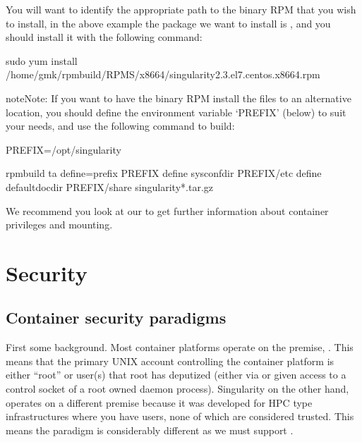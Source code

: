\documentclass[letterpaper,10pt,english]{sphinxmanual}
\begin{document}
You will want to identify the appropriate path to the binary RPM that
you wish to install, in the above example the package we want to install
is  , and you should install it with the following command:

%
\begin{sphinxVerbatim}[commandchars=\\\{\}]
\PYGZdl{} sudo yum install /home/gmk/rpmbuild/RPMS/x86\PYGZus{}64/singularity\PYGZhy{}2.3.el7.centos.x86\PYGZus{}64.rpm
\end{sphinxVerbatim}

\begin{sphinxadmonition}{note}{Note:}
If you want to have the binary RPM install the files to an
alternative location, you should define the environment variable
‘PREFIX’ (below) to suit your needs, and use the following command to
build:
\end{sphinxadmonition}

%
\begin{sphinxVerbatim}[commandchars=\\\{\}]
\PYGZdl{} PREFIX=/opt/singularity

\PYGZdl{} rpmbuild \PYGZhy{}ta \PYGZhy{}\PYGZhy{}define=\PYGZdq{}\PYGZus{}prefix \PYGZdl{}PREFIX\PYGZdq{} \PYGZhy{}\PYGZhy{}define \PYGZdq{}\PYGZus{}sysconfdir \PYGZdl{}PREFIX/etc\PYGZdq{} \PYGZhy{}\PYGZhy{}define \PYGZdq{}\PYGZus{}defaultdocdir \PYGZdl{}PREFIX/share\PYGZdq{} singularity\PYGZhy{}*.tar.gz
\end{sphinxVerbatim}

We recommend you look at our {\hyperref[\detokenize{security:security}]{}} to get further information about container
privileges and mounting.


\chapter{Security}
\label{\detokenize{security:security}}\label{\detokenize{security:id1}}\label{\detokenize{security::doc}}

\section{Container security paradigms}
\label{\detokenize{security:container-security-paradigms}}
First some background. Most container platforms operate on the
premise, . This means that
the primary UNIX account controlling the container platform is either
“root” or user(s) that root has deputized (either via  or given access
to a control socket of a root owned daemon process).
Singularity on the other hand, operates on a different premise because
it was developed for HPC type infrastructures where you have users,
none of which are considered trusted. This means the paradigm is
considerably different as we must support .
\end{document}

